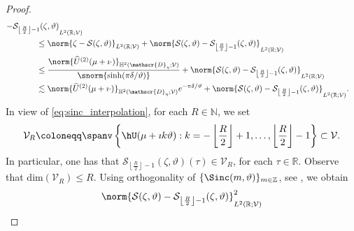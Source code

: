 \begin{proof}
\begin{equation}
\begin{aligned}
{        -
        \mathcal{S}_{\left\lfloor \frac{R}{2} \right\rfloor-1}(\zeta,\vartheta)
    }_{L^2(\mathbb{R};\mathcal{V})}
    \\
   	&
	\hspace{-2cm}
	\leq
    \norm{
        \zeta
        -
        \mathcal{S}(\zeta,\vartheta)
    }_{L^2(\mathbb{R};\mathcal{V})}
    +
    \norm{
        \mathcal{S}(\zeta,\vartheta)
        -
        \mathcal{S}_{\left\lfloor \frac{R}{2} \right\rfloor-1}(\zeta,\vartheta)
    }_{L^2(\mathbb{R};\mathcal{V})}
    \\
   	&
	\hspace{-2cm}
	\leq
    \frac{
        \norm{
             \widehat{U}^{(2)}(\mu+\imath\cdot)
        }_{\mathbb{H}^2(\mathscr{D}_\eta;\mathcal{V})}
    }{
        \snorm{\sinh(\pi \delta/\vartheta )}
    }
    +
    \norm{
        \mathcal{S}(\zeta,\vartheta)
        -
        \mathcal{S}_{\left\lfloor \frac{R}{2} \right\rfloor -1 }(\zeta,\vartheta)
    }_{L^2(\mathbb{R};\mathcal{V})}
    \\
   	&
	\hspace{-2cm}
	\lesssim
    \norm{
         \widehat{U}^{(2)}(\mu+\imath\cdot)
    }_{\mathbb{H}^2(\mathscr{D}_\eta;\mathcal{V})}
    e^{-\pi \delta/\vartheta }
    +
    \norm{
        \mathcal{S}(\zeta,\vartheta)
        -
        \mathcal{S}_{\left\lfloor \frac{R}{2} \right\rfloor-1}(\zeta,\vartheta)
    }_{L^2(\mathbb{R};\mathcal{V})}.
\end{aligned}
\end{equation}
In view of \eqref{eq:sinc_interpolation},
for each $R \in \mathbb{N}$, we set
\begin{equation}%
    \mathcal{V}_R 
    \coloneqq
    \spanv
    \left\{\hU(\mu+\imath k\vartheta): 
    k=-\left\lfloor \frac{R}{2}  \right\rfloor+1,\ldots,\left\lfloor \frac{R}{2} \right\rfloor-1
    \right\}
    \subset \mathcal{V}.
\end{equation}  
In particular, one has that
$\mathcal{S}_{\left\lfloor \frac{R}{2} \right\rfloor-1}(\zeta,\vartheta)(\tau) \in \mathcal{V}_R$,
for each $\tau \in \mathbb{R}$.
Observe that $\text{dim}(\mathcal{V}_R) \leq R$.
%
Using orthogonality of $\{\Sinc(m,\vartheta)\}_{m \in \mathbb{Z}}$, see \cite[p.139]{stenger2012numerical}, 
we obtain
\begin{align}
 \norm{
        \mathcal{S}(\zeta,\vartheta)
        -
        \mathcal{S}_{\left\lfloor \frac{R}{2} \right\rfloor-1}(\zeta,\vartheta)
    }_{L^2(\mathbb{R};\mathcal{V})}^2 

\end{align}
\end{proof}
